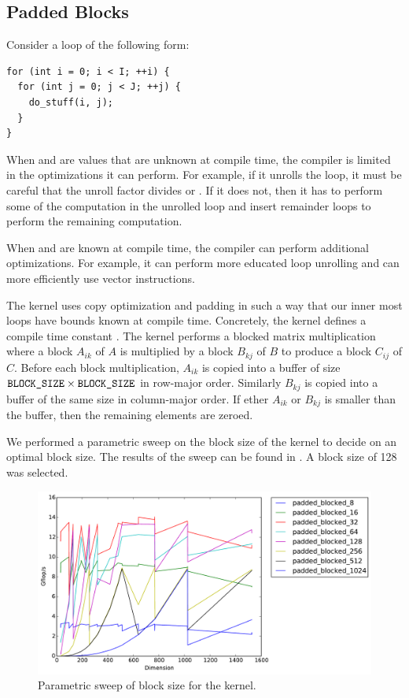 \subsection{Padded Blocks}
Consider a loop of the following form:
\begin{verbatim}
for (int i = 0; i < I; ++i) {
  for (int j = 0; j < J; ++j) {
    do_stuff(i, j);
  }
}
\end{verbatim}
When  and  are values that are unknown at compile time, the
compiler is limited in the optimizations it can perform. For example, if it
unrolls the loop, it must be careful that the unroll factor divides  or
. If it does not, then it has to perform some of the computation in the
unrolled loop and insert remainder loops to perform the remaining computation.

When  and  are known at compile time, the compiler can perform
additional optimizations. For example, it can perform more educated loop
unrolling and can more efficiently use vector instructions.

The  kernel uses copy optimization and padding in such a
way that our inner most loops have bounds known at compile time. Concretely,
the  kernel defines a compile time constant .
The kernel performs a blocked matrix multiplication where a block $A_{ik}$ of
$A$ is multiplied by a block $B_{kj}$ of $B$ to produce a block $C_{ij}$ of
$C$. Before each block multiplication, $A_{ik}$ is copied into a buffer of size
$\texttt{BLOCK\_SIZE} \times \texttt{BLOCK\_SIZE}$ in row-major order. Similarly
$B_{kj}$ is copied into a buffer of the same size in column-major order. If
ether $A_{ik}$ or $B_{kj}$ is smaller than the buffer, then the remaining
elements are zeroed.

We performed a parametric sweep on the block size of the 
kernel to decide on an optimal block size. The results of the sweep can be
found in . A block size of 128 was selected.

\begin{figure}[h]
  \centering
  \includegraphics[width=\textwidth]{img/timing_padded_sweep.pdf}
  \caption{Parametric sweep of block size for the  kernel.}
  \label{fig:padded-sweep}
\end{figure}
